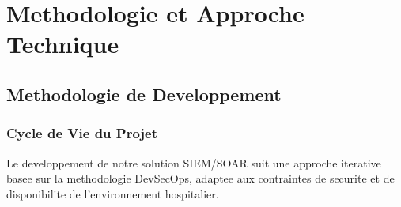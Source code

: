 \chapter{Methodologie et Approche Technique}

\section{Methodologie de Developpement}

\subsection{Cycle de Vie du Projet}

Le developpement de notre solution SIEM/SOAR suit une approche iterative basee sur la methodologie DevSecOps, adaptee aux contraintes de securite et de disponibilite de l'environnement hospitalier.
